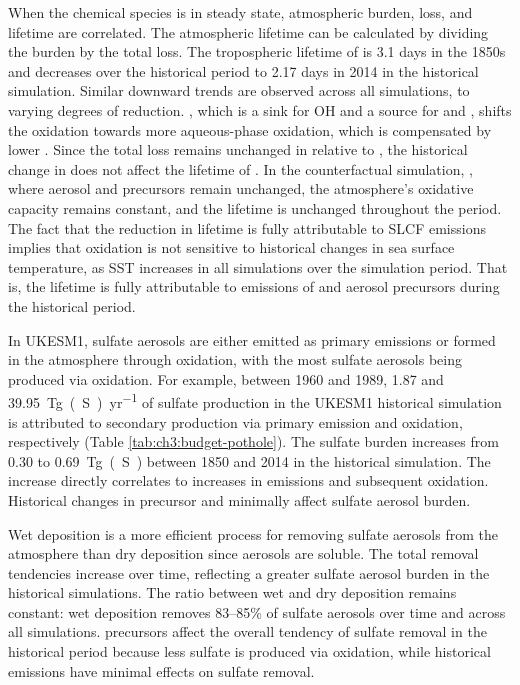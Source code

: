 When the chemical species is in steady state, atmospheric burden, loss, and lifetime are correlated. The atmospheric lifetime can be calculated by dividing the burden by the total loss. The tropospheric lifetime of  is 3.1 days in the 1850s and decreases over the historical period to 2.17 days in 2014 in the historical simulation. Similar downward trends are observed across all simulations, to varying degrees of reduction. , which is a sink for OH and a source for  and , shifts the oxidation towards more aqueous-phase oxidation, which is compensated by lower . Since the total  loss remains unchanged in \sstpich{} relative to \histsst{}, the historical change in  does not affect the lifetime of . In the counterfactual simulation, \sstpintcf{}, where aerosol and  precursors remain unchanged, the atmosphere's oxidative capacity remains constant, and the  lifetime is unchanged throughout the period. The fact that the reduction in  lifetime is fully attributable to SLCF emissions implies that  oxidation is not sensitive to historical changes in sea surface temperature, as SST increases in all simulations over the simulation period. That is, the  lifetime is fully attributable to emissions of  and aerosol precursors during the historical period. 


In UKESM1, sulfate aerosols are either emitted as primary emissions or formed in the atmosphere through oxidation, with the most sulfate aerosols being produced via oxidation. For example, between 1960 and 1989, \num{1.87} and \qty{39.95}{Tg(S)~yr^{-1}} of sulfate production in the UKESM1 historical simulation is attributed to secondary production via primary emission and oxidation, respectively (Table \ref{tab:ch3:budget-pothole}). The sulfate burden increases from \num{0.30} to \qty{0.69}{Tg(S)} between 1850 and 2014 in the historical simulation. The increase directly correlates to increases in  emissions and subsequent  oxidation. Historical changes in  precursor and  minimally affect sulfate aerosol burden. 


Wet deposition is a more efficient process for removing sulfate aerosols from the atmosphere than dry deposition since aerosols are soluble. The total removal tendencies increase over time, reflecting a greater sulfate aerosol burden in the historical simulations. The ratio between wet and dry deposition remains constant: wet deposition removes 83--85\% of sulfate aerosols over time and across all simulations.  precursors affect the overall tendency of sulfate removal in the historical period because less sulfate is produced via oxidation, while historical  emissions have minimal effects on sulfate removal.

